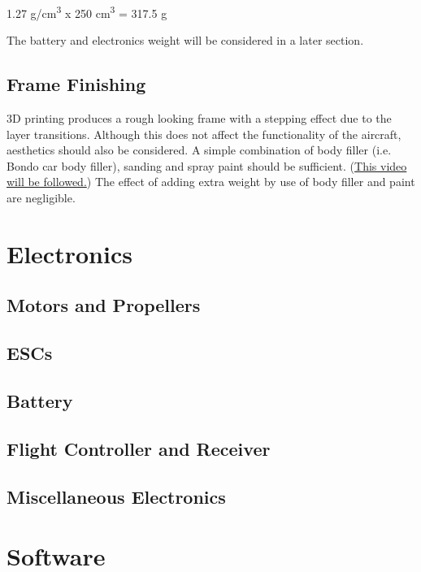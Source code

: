 \documentclass[12pt]{article}
\begin{document}
\centerline{1.27 g/cm\textsuperscript{3} x 250 cm\textsuperscript{3} = {\color{red}317.5 g}}
\vspace{5mm}
The battery and electronics weight will be considered in a later section.

\subsection{Frame Finishing}
3D printing produces a rough looking frame with a stepping effect due to the layer transitions. Although this does not affect the functionality of the aircraft, aesthetics should also be considered. A simple combination of body filler (i.e. Bondo car body filler), sanding and spray paint should be sufficient. (\href{https://www.youtube.com/watch?v=NR2RF40Oq6M}{\color{cyan}This video will be followed.}) The effect of adding extra weight by use of body filler and paint are negligible.

\section{Electronics}

\subsection{Motors and Propellers}

\subsection{ESCs}

\subsection{Battery}

\subsection{Flight Controller and Receiver}

\subsection{Miscellaneous Electronics}

\section{Software}
\end{document}

